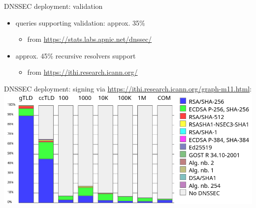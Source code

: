 \begin{frame}{DNSSEC deployment: validation}
    \begin{itemize}
    \item queries supporting validation: approx. 35\%
        \begin{itemize}
        \item from \url{https://stats.labs.apnic.net/dnssec/}
        \end{itemize}
    \item approx. 45\% recursive resolvers support 
        \begin{itemize}
        \item from \url{https://ithi.research.icann.org/}
        \end{itemize}
    \end{itemize}
\end{frame}

\begin{frame}{DNSSEC deployment: signing}
via {\small\url{https://ithi.research.icann.org/graph-m11.html}}: \\
\includegraphics[height=0.8\textheight]{../dns/ithi-dnssec-deploy-oct-domains}
\end{frame}
